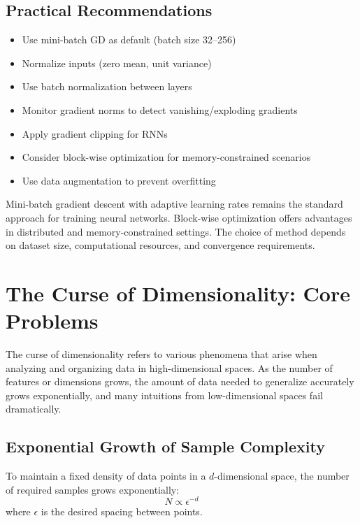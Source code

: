 \documentclass{tufte-handout}
\begin{document}
\subsection{Practical Recommendations}
\begin{itemize}
    \item Use mini-batch GD as default (batch size 32--256)
    \item Normalize inputs (zero mean, unit variance)
    \item Use batch normalization between layers
    \item Monitor gradient norms to detect vanishing/exploding gradients
    \item Apply gradient clipping for RNNs
    \item Consider block-wise optimization for memory-constrained scenarios
    \item Use data augmentation to prevent overfitting
\end{itemize}


Mini-batch gradient descent with adaptive learning rates remains the standard approach for training neural networks. Block-wise optimization offers advantages in distributed and memory-constrained settings. The choice of method depends on dataset size, computational resources, and convergence requirements.



\section{The Curse of Dimensionality: Core Problems}

The curse of dimensionality refers to various phenomena that arise when analyzing and organizing data in high-dimensional spaces. As the number of features or dimensions grows, the amount of data needed to generalize accurately grows exponentially, and many intuitions from low-dimensional spaces fail dramatically.


\subsection{Exponential Growth of Sample Complexity}

To maintain a fixed density of data points in a $d$-dimensional space, the number of required samples grows exponentially:
\begin{equation}
N \propto \epsilon^{-d}
\end{equation}
where $\epsilon$ is the desired spacing between points.
\end{document}
